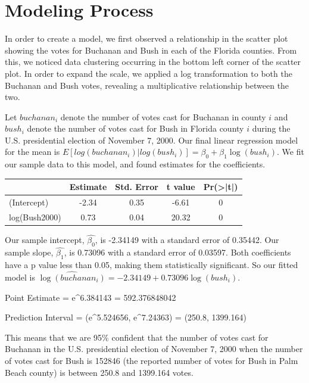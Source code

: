 \documentclass[
  letterpaper,
  DIV=11,
  numbers=noendperiod]{scrartcl}
\begin{document}
\section{Modeling Process}\label{modeling-process}

In order to create a model, we first observed a relationship in the
scatter plot showing the votes for Buchanan and Bush in each of the
Florida counties. From this, we noticed data clustering occurring in the
bottom left corner of the scatter plot. In order to expand the scale, we
applied a log transformation to both the Buchanan and Bush votes,
revealing a multiplicative relationship between the two.

Let \(buchanan_i\) denote the number of votes cast for Buchanan in
county \(i\) and \(bush_i\) denote the number of votes cast for Bush in
Florida county \(i\) during the U.S. presidential election of November
7, 2000. Our final linear regression model for the mean is
\(E[log(buchanan_i) | log(bush_i)] = \beta_0 + \beta_1\log(bush_i).\) We
fit our sample data to this model, and found estimates for the
coefficients.

\begin{table}[H]
\centering
\begin{tabular}[t]{lcccc}
\toprule
  & Estimate & Std. Error & t value & Pr(>|t|)\\
\midrule
(Intercept) & -2.34 & 0.35 & -6.61 & 0\\
log(Bush2000) & 0.73 & 0.04 & 20.32 & 0\\
\bottomrule
\end{tabular}
\end{table}

Our sample intercept, \(\hat{\beta_0}\), is -2.34149 with a standard
error of 0.35442. Our sample slope, \(\hat{\beta_1}\), is 0.73096 with a
standard error of 0.03597. Both coefficients have a p value less than
0.05, making them statistically significant. So our fitted model is
\(\widehat{\log(buchanan_i)} = -2.34149 + 0.73096\log(bush_i).\)

Point Estimate = e\^{}6.384143 = 592.376848042

Prediction Interval = (e\^{}5.524656, e\^{}7.24363) = (250.8, 1399.164)

This means that we are 95\% confident that the number of votes cast for
Buchanan in the U.S. presidential election of November 7, 2000 when the
number of votes cast for Bush is 152846 (the reported number of votes
for Bush in Palm Beach county) is between 250.8 and 1399.164 votes.
\end{document}
